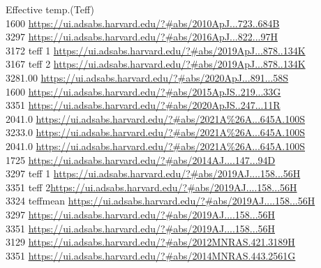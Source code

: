 Effective temp.(Teff)\\
1600 \url{https://ui.adsabs.harvard.edu/?#abs/2010ApJ...723..684B}\\
3297 \url{https://ui.adsabs.harvard.edu/?#abs/2016ApJ...822...97H}\\
3172 teff 1 \url{https://ui.adsabs.harvard.edu/?#abs/2019ApJ...878..134K}\\
3167 teff 2 \url{https://ui.adsabs.harvard.edu/?#abs/2019ApJ...878..134K}\\
3281.00	\url{https://ui.adsabs.harvard.edu/?#abs/2020ApJ...891...58S}\\
1600 \url{https://ui.adsabs.harvard.edu/?#abs/2015ApJS..219...33G}\\
3351 \url{https://ui.adsabs.harvard.edu/?#abs/2020ApJS..247...11R}\\
2041.0 \url{https://ui.adsabs.harvard.edu/?#abs/2021A%26A...645A.100S}\\
3233.0 \url{https://ui.adsabs.harvard.edu/?#abs/2021A%26A...645A.100S}\\	
2041.0 \url{https://ui.adsabs.harvard.edu/?#abs/2021A%26A...645A.100S}\\
1725 \url{https://ui.adsabs.harvard.edu/?#abs/2014AJ....147...94D}\\
3297 teff 1 \url{https://ui.adsabs.harvard.edu/?#abs/2019AJ....158...56H}\\
3351 teff 2\url{https://ui.adsabs.harvard.edu/?#abs/2019AJ....158...56H}\\
3324 teffmean \url{https://ui.adsabs.harvard.edu/?#abs/2019AJ....158...56H}\\
3297 \url{https://ui.adsabs.harvard.edu/?#abs/2019AJ....158...56H}\\
3351 \url{https://ui.adsabs.harvard.edu/?#abs/2019AJ....158...56H}\\
3129 \url{https://ui.adsabs.harvard.edu/?#abs/2012MNRAS.421.3189H}\\
3351 \url{https://ui.adsabs.harvard.edu/?#abs/2014MNRAS.443.2561G}\\

